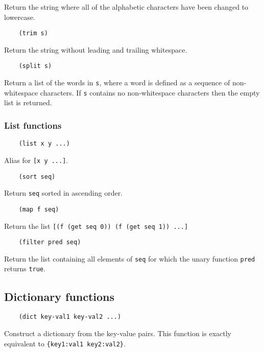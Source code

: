 \documentclass{article}
\newcommand{\inlinecode}{\texttt}
\begin{document}
Return the string where all of the alphabetic characters have been changed to lowercase.

\begin{verbatim}
    (trim s)
\end{verbatim}

Return the string without leading and trailing whitespace.

\begin{verbatim}
    (split s)
\end{verbatim}

Return a list of the words in \inlinecode{s}, where a word is defined as a sequence of non-whitespace characters. If \inlinecode{s} contains no non-whitespace characters then the empty list is returned.

\subsubsection{List functions}
\begin{verbatim}
    (list x y ...)
\end{verbatim}

Alias for \inlinecode{[x y ...]}.

\begin{verbatim}
    (sort seq)
\end{verbatim}

Return \inlinecode{seq} sorted in ascending order.

\begin{verbatim}
    (map f seq)
\end{verbatim}

Return the list \inlinecode{[(f (get seq 0)) (f (get seq 1)) ...]}

\begin{verbatim}
    (filter pred seq)
\end{verbatim}

Return the list containing all elements of \inlinecode{seq} for which the unary function \inlinecode{pred} returns \inlinecode{true}.

\subsection{Dictionary functions}
\begin{verbatim}
    (dict key-val1 key-val2 ...)
\end{verbatim}

Construct a dictionary from the key-value pairs. This function is exactly equivalent to \inlinecode{\{key1:val1 key2:val2\}}.
\end{document}
